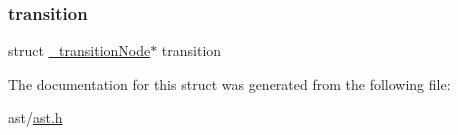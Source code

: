 \mbox{\label{struct__transition_ref_node_ab73ce20963a806d4098d62979f680cca}} 
\subsubsection{\texorpdfstring{transition}{transition}}
{\footnotesize\ttfamily struct \hyperlink{struct__transition_node}{\+\_\+transition\+Node}$\ast$ transition}



The documentation for this struct was generated from the following file\+:\begin{DoxyCompactItemize}
\item 
ast/\hyperlink{ast_8h}{ast.\+h}\end{DoxyCompactItemize}
